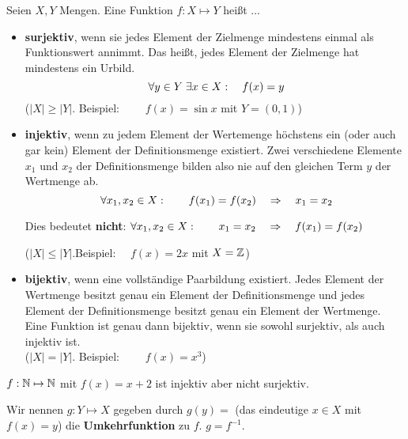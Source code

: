 \documentclass[main.tex]{subfiles}
\begin{document}
\begin{Definition}
  Seien $X,Y$ Mengen. Eine Funktion $f: X \mapsto Y$ heißt ...
  \begin{itemize}
    \item \textbf{surjektiv}, wenn sie jedes Element der Zielmenge mindestens einmal als Funktionswert annimmt. Das heißt, jedes Element der Zielmenge hat mindestens ein Urbild.
    $$\;\forall y \in Y \;\exists x \in X:\quad f(x)=y $$
    ($|X| \geq |Y|$. \quad Beispiel: $\qquad f(x)=\sin{x}$ mit $Y = (0,1)$)\\

    \item \textbf{injektiv}, wenn zu jedem Element der Wertemenge höchstens ein (oder auch gar kein) Element der Definitionsmenge existiert. Zwei verschiedene Elemente $x_{1}$ und $x_{2}$ der Definitionsmenge bilden also nie auf den gleichen Term $y$ der Wertmenge ab.
    $$\;\forall x_{1}, x_{2} \in X :\qquad f(x_{1}) = f(x_{2}) \quad \Rightarrow \quad x_{1}=x_{2} $$
    \begin{Bemerkung}
      Dies bedeutet \textbf{nicht}:\quad $\;\forall x_{1}, x_{2} \in X :\qquad x_{1} = x_{2} \quad\Rightarrow\quad f(x_{1}) = f(x_{2}) $
    \end{Bemerkung}
    ($|X| \leq |Y|$.\quad Beispiel: $\quad f(x)=2x$ \quad mit \quad $X=\mathbb{Z}$)\\

    \item \textbf{bijektiv}, wenn eine vollständige Paarbildung existiert. Jedes Element der Wertmenge besitzt genau ein Element der Definitionsmenge und jedes Element der Definitionsmenge besitzt genau ein Element der Wertmenge. Eine Funktion ist genau dann bijektiv, wenn sie sowohl surjektiv, als auch injektiv ist.\\
    ($|X| = |Y|$. \quad Beispiel: $\qquad f(x)=x^3 $)\\
  \end{itemize}
\end{Definition}

\begin{Beispiel}
  $f : \mathbb{N} \mapsto \mathbb{N}$ mit $f(x) = x + 2$ ist injektiv aber nicht surjektiv.
\end{Beispiel}

\begin{Definition}[Umkehrfunktion]
  Wir nennen $g: Y \mapsto X$ gegeben durch $g(y) = $ (das eindeutige $x \in X$ mit $f(x)=y$) die \textbf{Umkehrfunktion} zu $f$. $g=f^{-1}.$
\end{Definition}
\end{document}

